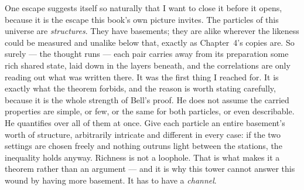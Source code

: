 \documentclass[fontsize=11pt,paper=a4,pagesize=auto,parskip=half-]{scrbook}
\begin{document}
One escape suggests itself so naturally that I want to close it before it opens, because it is the escape this book's own picture invites. The particles of this universe are \emph{structures}. They have basements; they are alike wherever the likeness could be measured and unalike below that, exactly as Chapter~4's copies are. So surely --- the thought runs --- each pair carries away from its preparation some rich shared state, laid down in the layers beneath, and the correlations are only reading out what was written there. It was the first thing I reached for. It is exactly what the theorem forbids, and the reason is worth stating carefully, because it is the whole strength of Bell's proof. He does not assume the carried properties are simple, or few, or the same for both particles, or even describable. He quantifies over all of them at once. Give each particle an entire basement's worth of structure, arbitrarily intricate and different in every case: if the two settings are chosen freely and nothing outruns light between the stations, the inequality holds anyway. Richness is not a loophole. That is what makes it a theorem rather than an argument --- and it is why this tower cannot answer this wound by having more basement. It has to have a \emph{channel}.
\end{document}

